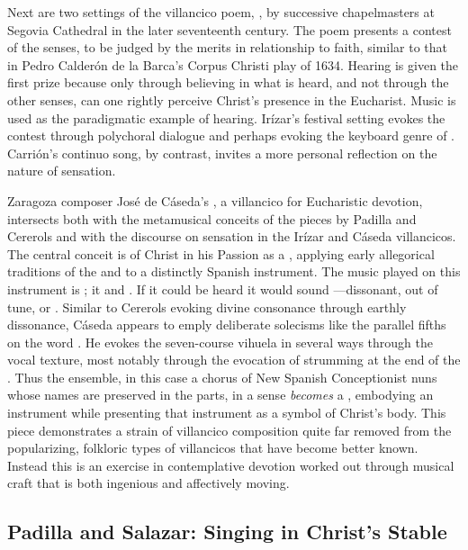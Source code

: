 Next are two settings of the villancico poem, , by successive chapelmasters at Segovia Cathedral in the later seventeenth century.
The poem presents a contest of the senses, to be judged by the merits in relationship to faith, similar to that in Pedro Calderón de la Barca's Corpus Christi play  of 1634.
Hearing is given the first prize because only through believing in what is heard, and not through the other senses, can one rightly perceive Christ's presence in the Eucharist.
Music is used as the paradigmatic example of hearing.
Irízar's festival setting evokes the contest through polychoral dialogue and perhaps evoking the keyboard genre of .
Carrión's continuo song, by contrast, invites a more personal reflection on the nature of sensation.

Zaragoza composer José de Cáseda's , a villancico for Eucharistic devotion, intersects both with the metamusical conceits of the pieces by Padilla and Cererols and with the discourse on sensation in the Irízar and Cáseda villancicos.
The central conceit is of Christ in his Passion as a , applying early allegorical traditions of the  and  to a distinctly Spanish instrument.
The music played on this instrument is ; it  and .
If it could be heard it would sound ---dissonant, out of tune, or . 
Similar to Cererols evoking divine consonance through earthly dissonance, Cáseda appears to emply deliberate solecisms like the parallel fifths on the word .
He evokes the seven-course vihuela in several ways through the vocal texture, most notably through the evocation of strumming at the end of the .
Thus the ensemble, in this case a chorus of New Spanish Conceptionist nuns whose names are preserved in the parts, in a sense \emph{becomes} a , embodying an instrument while presenting that instrument as a symbol of Christ's body.
This piece demonstrates a strain of villancico composition quite far removed from the popularizing, folkloric types of villancicos that have become better known.
Instead this is an exercise in contemplative devotion worked out through musical craft that is both ingenious and affectively moving.

\subsection{Padilla and Salazar: Singing in Christ's Stable}

